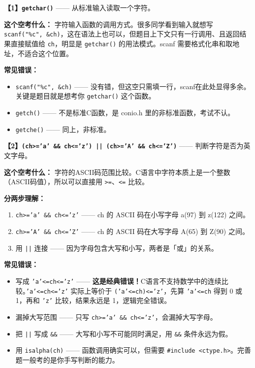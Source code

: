 \textbf{【1】\texttt{getchar()}} —— 从标准输入读取一个字符。

\vspace{0.3em}
\textbf{这个空考什么：} 字符输入函数的调用方式。很多同学看到输入就想写 \texttt{scanf("\%c", \&ch)}，这在语法上也可以，但题目上下文只有一行调用、且返回结果直接赋值给 \texttt{ch}，明显是 \texttt{getchar()} 的用法模式。scanf 需要格式化串和取地址，不适合这个位置。

\textbf{常见错误：}
\begin{itemize}
    \item \texttt{scanf("\%c", \&ch)} —— 没有错，但这空只需填一行，scanf在此处显得多余。关键是题目就是想考你 \texttt{getchar()} 这个函数。
    \item \texttt{getch()} —— 不是标准C函数，是 conio.h 里的非标准函数，考试不认。
    \item \texttt{getche()} —— 同上，非标准。
\end{itemize}

\vspace{0.6em}
\textbf{【2】\texttt{(ch>='a' \&\& ch<='z') || (ch>='A' \&\& ch<='Z')}} —— 判断字符是否为英文字母。

\vspace{0.3em}
\textbf{这个空考什么：} 字符的ASCII码范围比较。C语言中字符本质上是一个整数（ASCII码值），所以可以直接用 \texttt{>=}、\texttt{<=} 比较。

\textbf{分两步理解：}
\begin{enumerate}
    \item \texttt{ch>='a' \&\& ch<='z'} —— ch 的 ASCII 码在小写字母 a(97) 到 z(122) 之间。
    \item \texttt{ch>='A' \&\& ch<='Z'} —— ch 的 ASCII 码在大写字母 A(65) 到 Z(90) 之间。
    \item 用 \texttt{||} 连接 —— 因为字母包含大写和小写，两者是「或」的关系。
\end{enumerate}

\textbf{常见错误：}
\begin{itemize}
    \item 写成 \texttt{'a'<=ch<='z'} —— \textbf{这是经典错误！}C语言不支持数学中的连续比较。\texttt{'a'<=ch<='z'} 实际上等价于 \texttt{('a'<=ch)<='z'}，先算 \texttt{'a'<=ch} 得到 0 或 1，再和 \texttt{'z'} 比较，结果永远是 1，逻辑完全错误。
    \item 漏掉大写范围 —— 只写 \texttt{ch>='a' \&\& ch<='z'}，会漏掉大写字母。
    \item 把 \texttt{||} 写成 \texttt{\&\&} —— 大写和小写不可能同时满足，用 \texttt{\&\&} 条件永远为假。
    \item 用 \texttt{isalpha(ch)} —— 函数调用确实可以，但需要 \texttt{\#include <ctype.h>}。完善题一般考的是你手写判断的能力。
\end{itemize}

